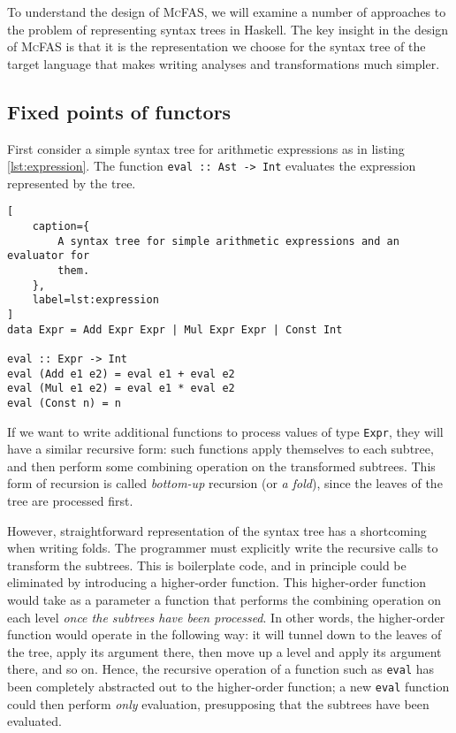 \documentclass[letterpaper,11pt]{article}
\newcommand{\mcfas}{\textsc{McFAS}}
\newcommand{\code}{\texttt}
\begin{document}
To understand the design of \mcfas, we will examine a number of approaches to
the problem of representing syntax trees in Haskell. The key insight in the
design of \mcfas{} is that it is the representation we choose for the syntax
tree of the target language that makes writing analyses and transformations
much simpler.

\subsection{Fixed points of functors} \label{sec:fix}

First consider a simple syntax tree for arithmetic expressions as in listing
\ref{lst:expression}. The function \code{eval :: Ast -> Int} evaluates the
expression represented by the tree.

\begin{lstlisting}[
    caption={
        A syntax tree for simple arithmetic expressions and an evaluator for
        them.
    },
    label=lst:expression
]
data Expr = Add Expr Expr | Mul Expr Expr | Const Int

eval :: Expr -> Int
eval (Add e1 e2) = eval e1 + eval e2
eval (Mul e1 e2) = eval e1 * eval e2
eval (Const n) = n
\end{lstlisting}

If we want to write additional functions to process values of type \code{Expr},
they will have a similar recursive form: such functions apply themselves to
each subtree, and then perform some combining operation on the transformed
subtrees. This form of recursion is called \emph{bottom-up} recursion (or
\emph{a fold}), since the leaves of the tree are processed first.

However, straightforward representation of the syntax tree has a shortcoming
when writing folds. The programmer must explicitly write the recursive calls to
transform the subtrees. This is boilerplate code, and in principle could be
eliminated by introducing a higher-order function. This higher-order function
would take as a parameter a function that performs the combining operation on
each level \emph{once the subtrees have been processed}. In other words, the
higher-order function would operate in the following way: it will tunnel down
to the leaves of the tree, apply its argument there, then move up a level and
apply its argument there, and so on. Hence, the recursive operation of a
function such as \code{eval} has been completely abstracted out to the
higher-order function; a new \code{eval} function could then perform
\emph{only} evaluation, presupposing that the subtrees have been evaluated.
\end{document}
